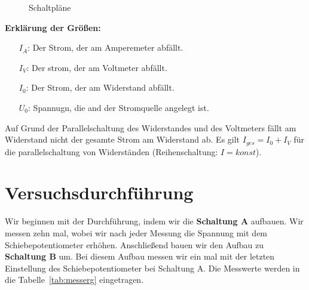 \documentclass[10pt,a4paper]{article}
\begin{document}
\begin{figure}[H]
\begin{subfigure}[c]{0.5\textwidth}
\end{subfigure}%
\caption[Schaltpläne]{Schaltpläne}
\label{fig:schaltungen}
\end{figure}

\begin{flushleft}
\textbf{Erklärung der Größen:}

\begin{itemize}
\item[$I_A$:] Der Strom, der am Amperemeter abfällt.
\item[$I_V$:] Der strom, der am Voltmeter abfällt.
\item[$I_0$:] Der Strom, der am Widerstand abfällt.
\item[$U_0$:] Spannugn, die and der Stromquelle angelegt ist.
\end{itemize}
Auf Grund der Parallelschaltung des Widerstandes und des Voltmeters fällt am Widerstand nicht der gesamte Strom am Widerstand ab. Es gilt $I_{ges} = I_0 + I_V$ für die parallelschaltung von Widerständen (Reihenschaltung: $I = konst$).
\end{flushleft}

\section{Versuchsdurchführung}
\begin{flushleft}
Wir beginnen mit der Durchführung, indem wir die \textbf{Schaltung A} aufbauen. Wir messen zehn mal, wobei wir nach jeder Messung die Spannung mit dem Schiebepotentiometer erhöhen. Anschließend bauen wir den Aufbau zu \textbf{Schaltung B} um. Bei diesem Aufbau messen wir ein mal mit der letzten Einstellung des Schiebepotentiometer bei Schaltung A. Die Messwerte werden in die Tabelle~\ref{tab:messerg} eingetragen.
\end{flushleft}
\end{document}
